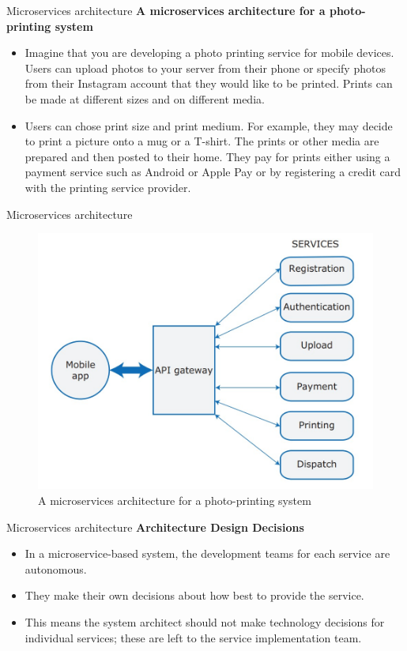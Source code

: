\documentclass{beamer}
\begin{document}
\begin{frame}{Microservices architecture}
	\textbf{A microservices architecture for a photo-printing system}
	\begin{itemize}
		\item Imagine that you are developing a photo printing service for mobile devices.
		Users can upload photos to your server from their phone or specify photos from
		their Instagram account that they would like to be printed. Prints can be made at
		different sizes and on different media.
		\item Users can chose print size and print medium. For example, they may decide to
		print a picture onto a mug or a T-shirt. The prints or other media are prepared and
		then posted to their home. They pay for prints either using a payment service
		such as Android or Apple Pay or by registering a credit card with the printing
		service provider.
	\end{itemize}
\end{frame}
\begin{frame}{Microservices architecture}
		\begin{figure}
		\includegraphics[scale=.3]{img/m5_12}
		\caption{A microservices architecture for a photo-printing system}
	\end{figure}
\end{frame}
\begin{frame}{Microservices architecture}
	\textbf{Architecture Design Decisions}
	\begin{itemize}
		\item In a microservice-based system, the development teams for each service are autonomous.
		\item They make their own decisions about how best to provide the service.
		\item This means the system architect should not 
		make technology decisions for individual services; these are left to the service implementation team. 
	\end{itemize}
\end{frame}
\end{document}
